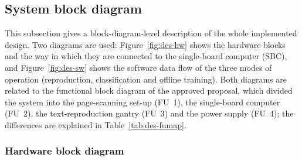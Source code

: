 \subsection{System block diagram}
\label{sec:blockdiagram}

This subsection gives a block-diagram-level description of the whole implemented design.
Two diagrams are used: Figure~\ref{fig:des-hw} shows the hardware blocks and the way in which they are connected to the single-board computer (SBC), and Figure~\ref{fig:des-sw} shows the software data flow of the three modes of operation (reproduction, classification and offline training).
Both diagrams are related to the functional block diagram of the approved proposal, which divided the system into the page-scanning set-up (FU~1), the single-board computer (FU~2), the text-reproduction gantry (FU~3) and the power supply (FU~4); the differences are explained in Table~\ref{tab:des-fumap}.

\subsubsection{Hardware block diagram}

